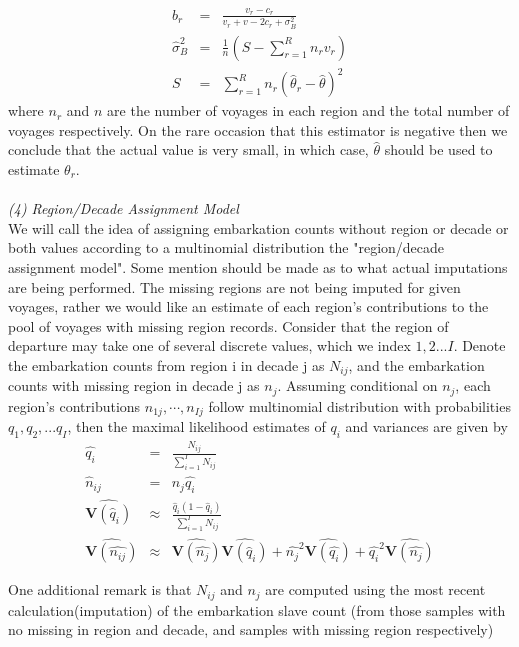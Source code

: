 \documentclass{article}
\begin{document}
\begin{eqnarray}
b_r &=& \frac{v_r - c_r}{v_r + v - 2c_r + \sigma_B^2}\\
\hat{\sigma}_B^2 &=& \frac{1}{n}(S - \sum_{r=1}^R n_r v_r)\\
S &=& \sum_{r=1}^R n_r (\hat{\theta}_r - \hat{\theta})^2
\end{eqnarray}
where $n_r$ and $n$ are the number of voyages in each region and the
total number of voyages respectively. 
On the rare occasion that this estimator is negative then we conclude
that the actual value is very small, in which case, $\hat{\theta}$
should be used to estimate $\theta_r$.\\
\\
\textit{(4) Region/Decade Assignment Model}\\
\indent
We will call the idea of assigning embarkation counts without region or
decade or both values according to a multinomial distribution the "region/decade
assignment model".
Some mention should be made as to what actual imputations are being performed.
The missing regions are not being imputed for given voyages, rather we would like an estimate of each region's contributions to the pool of voyages with missing region records. Consider that the  region of departure may take one of several discrete values, which we index $1,2...I$.
Denote the embarkation counts from region i in decade j as $N_{ij}$,
 and the  embarkation counts with missing region in decade j as $n_j$. Assuming conditional on $n_j$,  each region's contributions $n_{1j},\cdots,n_{Ij} $ follow multinomial distribution with probabilities $q_1,q_2,...q_I$, then the maximal likelihood estimates of $q_i$  and variances are 
given by
\begin{eqnarray}
\hat{q_i}&=&\frac{N_{ij}}{\sum_{i=1} ^{I}{N_{ij}}}\\
\hat{n}_{ij}&=&n_j \hat{q_i} \\
\widehat{\mathbf{V}(\hat{q}_i)} &\approx& \frac{\hat{q}_i(1 - \hat{q}_i)}{\sum_{i=1} ^{I}{N_{ij}}} \\
\widehat{\mathbf{V}(\hat{n_{ij}})}&\approx& \widehat{\mathbf{V}(\hat{n_j})} \widehat{\mathbf{V}(\hat{q}_i)} + \hat{n_j}^2\widehat{\mathbf{V}(\hat{q_i})}+\hat{q_i}^2\widehat{\mathbf{V}(\hat{n_j})}
\end{eqnarray}
\par
One additional remark is that $N_{ij}$ and $n_j$ are computed using the most recent calculation(imputation) of the embarkation slave count (from those samples with no missing in region and 
decade, and samples with missing region respectively)\\
\end{document}
